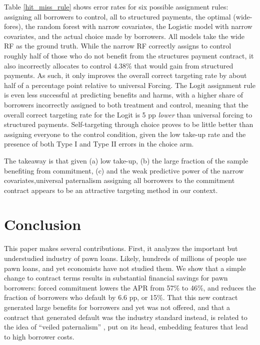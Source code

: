 \documentclass[12pt, a4paper]{article}
\begin{document}
Table \ref{hit_miss_rule} shows error rates for six possible assignment rules: assigning all borrowers to control, all to structured payments, the optimal (wide-fores), the random forest with narrow covariates, the Logistic model with narrow covariates, and the actual choice made by borrowers.  All models take the wide RF as the ground truth. While the narrow RF correctly assigns to control roughly half of those who do not benefit from the structures payment contract, it also incorrectly allocates to control 4.38\%  that would gain from structured payments. As such, it only improves the overall correct targeting rate by about half of a percentage point relative to universal Forcing. The Logit assignment rule is even less successful at predicting benefits and harms, with a higher share of borrowers incorrectly assigned to both treatment and control, meaning that the overall correct targeting rate for the Logit is 5 pp \textit{lower} than universal forcing to structured payments.  Self-targeting through choice proves to be little better than assigning everyone to the control condition, given the low take-up rate and the presence of both Type I and Type II errors in the choice arm.  

The takeaway is that given (a) low take-up, (b) the large fraction of the sample benefiting from commitment, (c) and the weak predictive power of the narrow covariates,universal paternalism assigning all borrowers to the commitment contract appears to be an attractive targeting method in our context.

    
\section{Conclusion} \label{conclusion}

This paper makes several contributions. First, it analyzes the important but understudied industry of pawn loans. Likely, hundreds of millions of people use pawn loans, and yet economists have not studied them. We show that a simple change to contract terms results in substantial financial savings for pawn borrowers: forced commitment lowers the APR from 57\% to 46\%, and reduces the fraction of borrowers who default by 6.6 pp, or 15\%. That this new contract generated large benefits for borrowers and yet was not offered, and that a contract that generated default was the industry standard instead, is related to the idea of ``veiled paternalism'' \cite{Laibson2018}, put on its head, %
embedding features that lead to high borrower costs.
\end{document}
